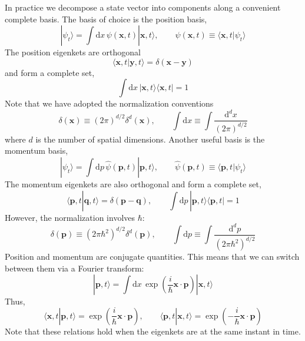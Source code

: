 In practice we decompose a state vector into components along a convenient complete basis. The basis of choice is the position basis,
\begin{equation}
	| \psi_{t} \rangle = \int \mathrm{d}x \, \psi(\mathbf{x}, t) | \mathbf{x}, t \rangle, \qquad \psi(\mathbf{x}, t) \equiv \langle \mathbf{x}, t | \psi_{t} \rangle
\end{equation}
The position eigenkets are orthogonal
\begin{equation}
	\langle \mathbf{x}, t | \mathbf{y}, t \rangle = \delta(\mathbf{x} - \mathbf{y})
\end{equation}
and form a complete set,
\begin{equation}
	\int \mathrm{d}x \, | \mathbf{x}, t \rangle \langle \mathbf{x}, t | = 1
\end{equation}
Note that we have adopted the normalization conventions
\begin{equation}
	\delta(\mathbf{x}) \equiv \left( 2 \pi \right)^{d/2} \delta^{d}(\mathbf{x}), \qquad \int \mathrm{d}x \equiv \int \frac{\mathrm{d}^{d}x}{(2 \pi)^{d/2}}
\end{equation}
where $d$ is the number of spatial dimensions. Another useful basis is the momentum basis,
\begin{equation}
	| \psi_{t} \rangle = \int \mathrm{d}p \, \hat{\psi}(\mathbf{p}, t) | \mathbf{p}, t \rangle, \qquad \hat{\psi}(\mathbf{p}, t) \equiv \langle \mathbf{p}, t | \psi_{t} \rangle
\end{equation}
The momentum eigenkets are also orthogonal and form a complete set,
\begin{equation}
	\langle \mathbf{p}, t | \mathbf{q}, t \rangle = \delta(\mathbf{p} - \mathbf{q}), \qquad \int \mathrm{d}p \, | \mathbf{p}, t \rangle \langle \mathbf{p}, t | = 1
\end{equation}
However, the normalization involves $\hbar$:
\begin{equation}
	\delta(\mathbf{p}) \equiv \left( 2 \pi \hbar^{2} \right)^{d/2} \delta^{d}(\mathbf{p}), \qquad \int \mathrm{d}p \equiv \int \frac{\mathrm{d}^{d}p}{(2 \pi \hbar^{2})^{d/2}}
\end{equation}
Position and momentum are conjugate quantities. This means that we can switch between them via a Fourier transform:
\begin{equation}
	| \mathbf{p}, t \rangle = \int \mathrm{d}x \, \exp{\left( \frac{i}{\hbar} \mathbf{x} \cdot \mathbf{p} \right)} | \mathbf{x}, t \rangle
\end{equation}
Thus,
\begin{equation}
	\langle \mathbf{x}, t | \mathbf{p}, t \rangle = \exp{\left( \frac{i}{\hbar} \mathbf{x} \cdot \mathbf{p} \right)}, \qquad \langle \mathbf{p}, t | \mathbf{x}, t \rangle = \exp{\left(- \frac{i}{\hbar} \mathbf{x} \cdot \mathbf{p} \right)}
\end{equation}
Note that these relations hold when the eigenkets are at the same instant in time.

